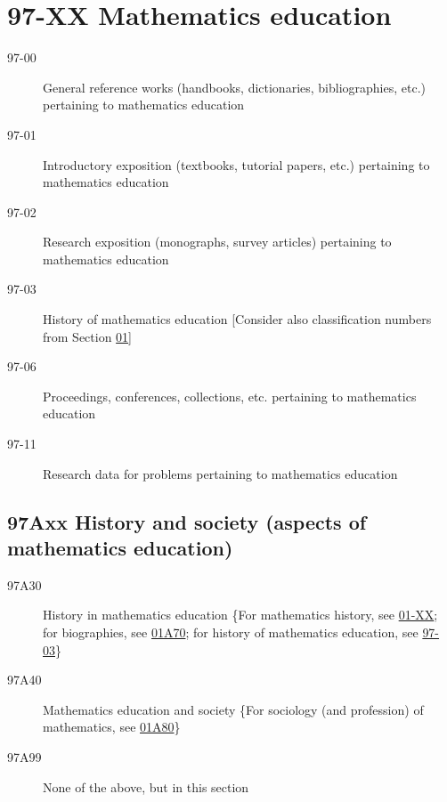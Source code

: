 \documentclass[letterpaper]{article}
\begin{document}
\section*{97-XX Mathematics education }\label{97-XX}
\begin{description}
\item [97-00]\label{97-00} General reference works (handbooks, dictionaries, bibliographies, etc.) pertaining to mathematics education
\item [97-01]\label{97-01} Introductory exposition (textbooks, tutorial papers, etc.) pertaining to mathematics education
\item [97-02]\label{97-02} Research exposition (monographs, survey articles) pertaining to mathematics education
\item [97-03]\label{97-03} History of mathematics education [Consider also classification numbers from Section \hyperref[01-XX]{01}]
\item [97-06]\label{97-06} Proceedings, conferences, collections, etc. pertaining to mathematics education
\item [97-11]\label{97-11} Research data for problems pertaining to mathematics education
\end{description}
\subsection*{97Axx  History and society (aspects of mathematics education) }\label{97Axx}
\begin{description}  
\item [97A30]\label{97A30} History in mathematics education \{For mathematics history, see \hyperref[01-XX]{01-XX}; for biographies, see \hyperref[01A70]{01A70}; for history of mathematics education, see \hyperref[97-03]{97-03}\}
\item [97A40]\label{97A40} Mathematics education and society \{For sociology (and profession) of mathematics, see \hyperref[01A80]{01A80}\}
\item [97A99]\label{97A99} None of the above, but in this section
\end{description}
\end{document}
